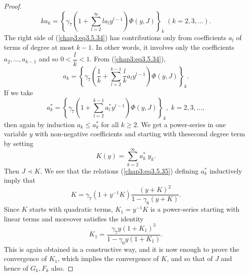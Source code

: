 \begin{proof}
\begin{equation*}
ka_k = \left\{\gamma_7 \left(1+ \sum\limits^\infty_{l=2} la_l y^{l-1}
\right) \Phi (y,J) \right\}_k \;  (k =2,3,
\ldots). \tag{3.5.34}\label{chap3:eq3.5.34} 
\end{equation*}
The right side of (\ref{chap3:eq3.5.34}) has contributions only from
coefficients $a_l$ of terms of degree at most $k-1$. In other words,
it involves only the coefficients $a_2, \ldots, a_{k-1}$ and so $0 <
\dfrac{l}{k} < 1$. From (\ref{chap3:eq3.5.34}), 
$$
a_k = \left\{ \gamma_7 \left(\frac{1}{k} + \sum\limits^{k-1}_{l=2}
\frac{l}{k}a_l y^{l-1} \right) \Phi (y,J) \right\}_k.  
$$
If we take
\begin{equation*}
a^*_k = \left\{ \gamma_7 \left(1+ \sum\limits^{k-1}_{l=2} a^*_l
y^{l-1} \right) \Phi (y,J) \right\}_k, \; k = 2,3, \ldots,
\tag{3.5.35}\label{chap3:eq3.5.35} 
\end{equation*}
then again by induction $a_k \leq a^*_k$ for all $k \geq 2$. We get a
power-series in one variable $y$ with non-negative coefficients and
starting with the\pageoriginale second degree term by setting 
$$
K(y) = \sum\limits^\infty_{k=2} a^*_k \; y_k. 
$$
Then $J \prec K$. We see that the relations (\ref{chap3:eq3.5.35})
defining $a^*_k$ inductively imply that  
$$
K = \gamma_7 (1+ y^{-1} K) \frac{(y+K)^2}{1-\gamma_6 (y+K)}. 
$$
Since $K$ starts with quadratic terms, $K_1 = y^{-1} K$ is a
power-series starting with linear terms and moreover satisfies the
identity  
\begin{equation*}
K_1 = \frac{\gamma_7 y (1+ K_1)^3}{1-\gamma_6 y
  (1+K_1)}. \tag{3.5.36}\label{chap3:eq3.5.36} 
\end{equation*}
This is again obtained in a constructive way, and it is now enough to
prove the convergence of $K_1$, which implies the convergence of $K$,
and so that of $J$ and hence of $G_k, F_k$ also. 


\end{proof}
